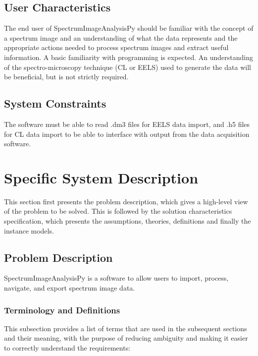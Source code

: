 \documentclass[12pt]{article}
\newcommand{\progname}{SpectrumImageAnalysisPy} %
\begin{document}
\subsection{User Characteristics} \label{SecUserCharacteristics}

The end user of \progname{} should be familiar with the concept of a spectrum
image and an understanding of what the data represents and the appropriate
actions needed to process spectrum images and extract useful information. A basic familiarity with programming is expected. An
understanding of the spectro-microscopy technique (CL or EELS) used to generate the data will
be beneficial, but is not strictly required. 

\subsection{System Constraints}

The software must be able to read .dm3 files for EELS data import, and .h5 files for CL data import to be able to interface with output from the data acquisition software.

\section{Specific System Description}

This section first presents the problem description, which gives a high-level
view of the problem to be solved.  This is followed by the solution characteristics
specification, which presents the assumptions, theories, definitions and finally
the instance models.  

\subsection{Problem Description} \label{Sec_pd}

\progname{} is a software to allow users to import, process, navigate, and export spectrum image data. 

\subsubsection{Terminology and  Definitions}

This subsection provides a list of terms that are used in the subsequent
sections and their meaning, with the purpose of reducing ambiguity and making it
easier to correctly understand the requirements:
\end{document}
